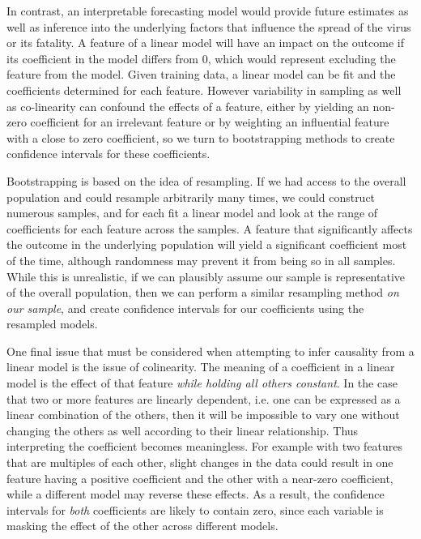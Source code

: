 \documentclass[11pt]{article}
\begin{document}
In contrast, an interpretable forecasting model would provide future estimates as well as inference into the underlying factors that influence the spread of the virus or its fatality. A feature of a linear model will have an impact on the outcome if its coefficient in the model differs from 0, which would represent excluding the feature from the model. Given training data, a linear model can be fit and the coefficients determined for each feature. However variability in sampling as well as co-linearity can confound the effects of a feature, either by yielding an non-zero coefficient for an irrelevant feature or by weighting an influential feature with a close to zero coefficient, so we turn to bootstrapping methods to create confidence intervals for these coefficients. 

Bootstrapping is based on the idea of resampling. If we had access to the overall population and could resample arbitrarily many times, we could construct numerous samples, and for each fit a linear model and look at the range of coefficients for each feature across the samples. A feature that significantly affects the outcome in the underlying population will yield a significant coefficient most of the time, although randomness may prevent it from being so in all samples. While this is unrealistic, if we can plausibly assume our sample is representative of the overall population, then we can perform a similar resampling method \textit{on our sample}, and create confidence intervals for our coefficients using the resampled models.  

One final issue that must be considered when attempting to infer causality from a linear model is the issue of colinearity. The meaning of a coefficient in a linear model is the effect of that feature \textit{while holding all others constant}. In the case that two or more features are linearly dependent, i.e. one can be expressed as a linear combination of the others, then it will be impossible to vary one without changing the others as well according to their linear relationship. Thus interpreting the coefficient becomes meaningless. For example with two features that are multiples of each other, slight changes in the data could result in one feature having a positive coefficient and the other with a near-zero coefficient, while a different model may reverse these effects. As a result, the confidence intervals for \textit{both} coefficients are likely to contain zero, since each variable is masking the effect of the other across different models. 
\end{document}
